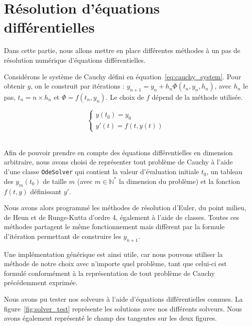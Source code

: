 \section*{Résolution d'équations différentielles}

Dans cette partie, nous allons mettre en place différentes méthodes à un pas de résolution numérique d'équations différentielles.
\vskip 1mm ~

Considérons le système de Cauchy défini en équation~\ref{eq:cauchy_system}. Pour obtenir $y$, on le construit par itérations : $y_{n+1} = y_n + h_n\Phi(t_n, y_n, h_n)$, avec $h_n$ le pas, $t_n = n\times h_n$ et $\Phi = f(t_n,y_n)$. Le choix de $f$ dépend de la méthode utilisée.

\begin{equation}
	\label{eq:cauchy_system}
	\begin{cases}
		y(t_0) = y_0\\
		y'(t) = f(t, y(t))
	\end{cases}
\end{equation}
\vskip 1mm ~

Afin de pouvoir prendre en compte des équations différentielles en dimension arbitraire, nous avons choisi de représenter tout problème de Cauchy à l'aide d'une classe \verb|OdeSolver| qui contient la valeur d'évaluation initiale $t_0$, un tableau des $y_m(t_0)$ de taille $m$ (avec $m\in\mathbb{N}^*$ la dimension du problème) et la fonction $f(t,y)$ définissant $y'$.
\vskip 1mm ~

Nous avons alors programmé les méthodes de résolution d'Euler, du point milieu, de Heun et de Runge-Kutta d'ordre 4, également à l'aide de classes. Toutes ces méthodes partagent le même fonctionnement mais diffèrent par la formule d'itération permettant de construire les $y_{n+1}$.

Une implémentation générique est ainsi utile, car nous pouvons utiliser la méthode de notre choix avec n'importe quel problème, tant que celui-ci est formulé conformément à la représentation de tout problème de Cauchy précédemment exprimée.
\vskip 1mm ~

Nous avons pu tester nos solveurs à l'aide d'équations différentielles connues. La figure~\ref{fig:solver_test} représente les solutions avec nos différents solveurs. Nous avons également représenté le champ des tangentes sur les deux figures.

